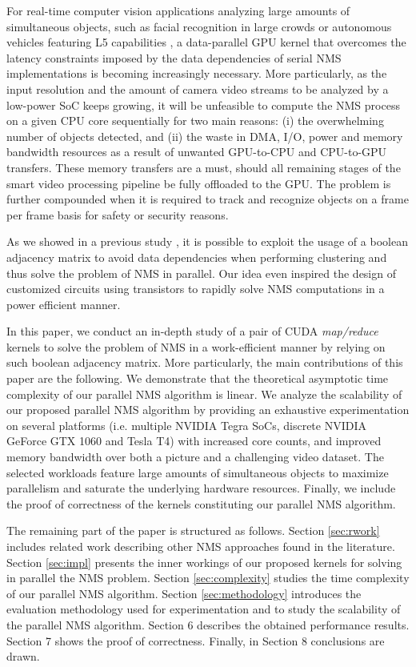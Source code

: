 For real-time computer vision applications analyzing large amounts of simultaneous objects, such as facial recognition in large crowds or autonomous vehicles featuring 
L5 capabilities \cite{litman2017autonomous}, a data-parallel GPU kernel that overcomes the latency constraints imposed by the data dependencies of serial 
NMS implementations is becoming increasingly necessary. More particularly, as the input resolution and the amount of camera video streams to be analyzed by a low-power 
SoC keeps growing, it will be unfeasible to compute the NMS process on a given CPU core sequentially for two main reasons: (i)  the overwhelming number of objects detected, 
and (ii) the waste in DMA, I/O, power and memory bandwidth resources as a result of unwanted GPU-to-CPU and CPU-to-GPU transfers. These memory transfers are a must, should 
all remaining stages of the smart video processing pipeline be fully offloaded to the GPU. The problem is further compounded when it is required to track and 
recognize objects on a frame per frame basis for safety or security reasons.

As we showed in a previous study \cite{oro2016work}, it is possible to exploit the usage of a boolean adjacency matrix to avoid data dependencies when performing 
clustering and thus solve the problem of NMS in parallel. Our idea even inspired the design of customized circuits using transistors \cite{shi2019fast} to rapidly 
solve NMS computations in a power efficient manner.

In this paper, we conduct an in-depth study of a pair of CUDA \emph{map/reduce} kernels to solve the problem of NMS in a work-efficient manner by relying on such boolean 
adjacency matrix. More particularly, the main contributions of this paper are the following. We demonstrate that the theoretical asymptotic time complexity of our parallel NMS 
algorithm is linear. We analyze the scalability of our proposed parallel NMS algorithm by providing an exhaustive experimentation on several platforms (i.e. multiple NVIDIA 
Tegra SoCs, discrete NVIDIA GeForce GTX 1060 and Tesla T4) with increased core counts, and improved memory bandwidth over both a picture and a challenging video dataset. The 
selected workloads feature large amounts of simultaneous objects to maximize parallelism and saturate the underlying hardware resources. Finally, we include the proof of 
correctness of the kernels constituting our parallel NMS algorithm.

The remaining part of the paper is structured as follows. Section \ref{sec:rwork} includes related work describing other NMS approaches found in the literature. Section 
\ref{sec:impl} presents the inner workings of our proposed kernels for solving in parallel the NMS problem. Section \ref{sec:complexity} studies the time complexity of our 
parallel NMS algorithm. Section \ref{sec:methodology} introduces the evaluation methodology used for experimentation and to study the scalability of the parallel 
NMS algorithm. Section 6 describes the obtained performance results. Section 7 shows the proof of correctness. Finally, in Section 8 conclusions are drawn.


